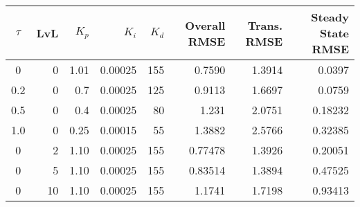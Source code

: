 \documentclass{article}
\begin{document}
	
	\begin{tabular}{cr|rrr|rrr}
		 $\tau$ & LvL & $K_p$ & $K_i$ & $K_d$ & Overall RMSE & Trans. RMSE &  Steady State RMSE \\ \hline
		 0 & 0 & 1.01 & 0.00025 & 155 & 0.7590 & 1.3914 & 0.0397 \\
		 0.2 & 0 & 0.7 & 0.00025 & 125 & 0.9113 & 1.6697 & 0.0759 \\
		 0.5 & 0 & 0.4 & 0.00025 & 80 & 1.231 & 2.0751 & 0.18232 \\
		 1.0 & 0 & 0.25 & 0.00015 & 55  & 1.3882 & 2.5766 & 0.32385 \\
		 0 & 2 & 1.10 & 0.00025 & 155 & 0.77478 & 1.3926 & 0.20051 \\
		 0 & 5 & 1.10 & 0.00025 & 155 & 0.83514 & 1.3894 & 0.47525 \\
		 0 & 10& 1.10 & 0.00025 & 155 & 1.1741 & 1.7198 & 0.93413 \\
	\end{tabular}
	
\end{document}
